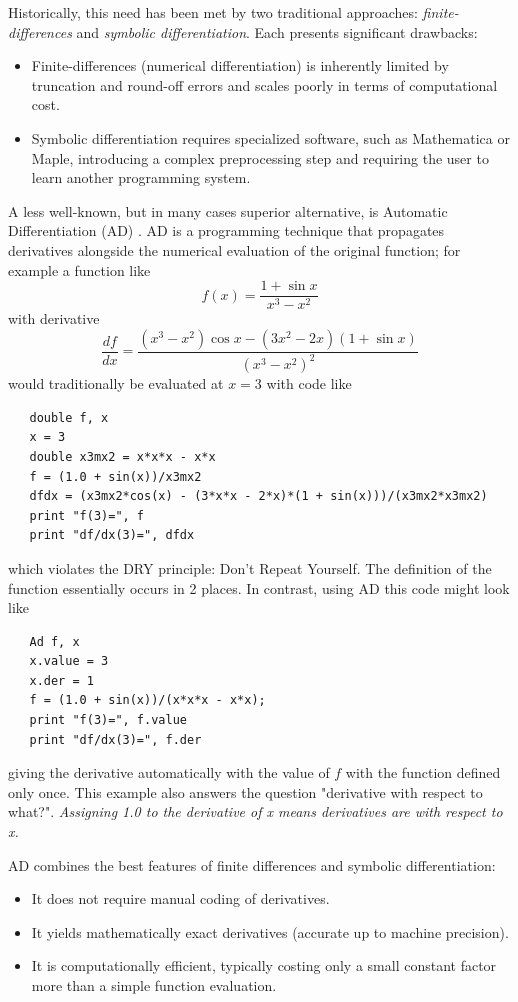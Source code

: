 \documentclass[10pt,openany,twoside]{book}
\numberwithin{equation}{section}   %
\begin{document}
Historically, this need has been met by two traditional
approaches: \emph{finite-differences} and \emph{symbolic differentiation}.
Each presents significant drawbacks:
\begin{itemize}
\item Finite-differences (numerical differentiation)
is inherently limited by truncation and round-off errors and scales
poorly in terms of computational cost.
\item Symbolic differentiation requires specialized software, such as
Mathematica or Maple, introducing a complex preprocessing step and
requiring the user to learn another programming system.
\end{itemize}

A less well-known, but in many cases superior alternative, is
Automatic Differentiation (AD) \cite{rall1981automatic,autodiff}. AD
is a programming technique that propagates derivatives alongside the
numerical evaluation of the original function; for example
a function like
\begin{displaymath}
	f(x) = \frac{1 + \sin x}{x^3 - x^2}
\end{displaymath}
with derivative
\begin{displaymath}
	\frac{df}{dx} = \frac{(x^3 - x^2)\cos x -
		(3x^2 - 2x)(1 + \sin x)}{(x^3 - x^2)^2}
\end{displaymath}
would traditionally be evaluated at $x = 3$ with code like
\begin{lstlisting}
   double f, x
   x = 3
   double x3mx2 = x*x*x - x*x
   f = (1.0 + sin(x))/x3mx2
   dfdx = (x3mx2*cos(x) - (3*x*x - 2*x)*(1 + sin(x)))/(x3mx2*x3mx2)
   print "f(3)=", f
   print "df/dx(3)=", dfdx
\end{lstlisting}
which violates the DRY principle: Don't Repeat Yourself.
The definition of the function essentially occurs in 2 places.
In contrast, using AD this code might look like
\begin{lstlisting}
   Ad f, x
   x.value = 3
   x.der = 1
   f = (1.0 + sin(x))/(x*x*x - x*x);
   print "f(3)=", f.value
   print "df/dx(3)=", f.der
\end{lstlisting}
giving the derivative automatically with the value of $f$ with
the function defined only once.
This example also answers the question "derivative with respect to what?".
\emph{Assigning 1.0 to the derivative of x means derivatives are with respect
to x.}

AD combines the best features of finite differences and symbolic
differentiation:
\begin{itemize}
\item It does not require manual coding of derivatives.
\item It yields mathematically exact derivatives (accurate up to
machine precision).
\item It is computationally efficient, typically costing only
a small constant factor more than a simple function evaluation.
\end{itemize}
\end{document}
